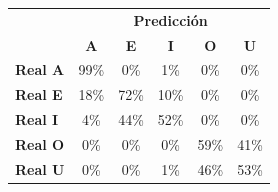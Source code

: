 \begin{tabular}{lccccc}
\toprule
 & \multicolumn{5}{c}{\textbf{Predicción}} \\
 & \textbf{A} & \textbf{E} & \textbf{I} & \textbf{O} & \textbf{U} \\
\midrule
\textbf{Real A} & \cellcolor[rgb]{0.31,0.31,1.00} \color{white} 99\% & \cellcolor[rgb]{1.00,1.00,1.00}  0\% & \cellcolor[rgb]{0.99,0.99,1.00}  1\% & \cellcolor[rgb]{1.00,1.00,1.00}  0\% & \cellcolor[rgb]{1.00,1.00,1.00}  0\% \\
\textbf{Real E} & \cellcolor[rgb]{0.87,0.87,1.00}  18\% & \cellcolor[rgb]{0.50,0.50,1.00} \color{white} 72\% & \cellcolor[rgb]{0.93,0.93,1.00}  10\% & \cellcolor[rgb]{1.00,1.00,1.00}  0\% & \cellcolor[rgb]{1.00,1.00,1.00}  0\% \\
\textbf{Real I} & \cellcolor[rgb]{0.97,0.97,1.00}  4\% & \cellcolor[rgb]{0.69,0.69,1.00}  44\% & \cellcolor[rgb]{0.64,0.64,1.00} \color{white} 52\% & \cellcolor[rgb]{1.00,1.00,1.00}  0\% & \cellcolor[rgb]{1.00,1.00,1.00}  0\% \\
\textbf{Real O} & \cellcolor[rgb]{1.00,1.00,1.00}  0\% & \cellcolor[rgb]{1.00,1.00,1.00}  0\% & \cellcolor[rgb]{1.00,1.00,1.00}  0\% & \cellcolor[rgb]{0.59,0.59,1.00} \color{white} 59\% & \cellcolor[rgb]{0.71,0.71,1.00}  41\% \\
\textbf{Real U} & \cellcolor[rgb]{1.00,1.00,1.00}  0\% & \cellcolor[rgb]{1.00,1.00,1.00}  0\% & \cellcolor[rgb]{0.99,0.99,1.00}  1\% & \cellcolor[rgb]{0.68,0.68,1.00}  46\% & \cellcolor[rgb]{0.63,0.63,1.00} \color{white} 53\% \\
\bottomrule
\end{tabular}